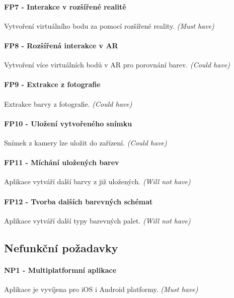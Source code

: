 \paragraph{FP7 - Interakce v rozšířené realitě} Vytvoření virtuálního bodu za pomocí rozšířené reality. \emph{(Must have)} 
\paragraph{FP8 - Rozšířená interakce v AR} Vytvoření více virtuálních bodů v AR pro porovnání barev. \emph{(Could have)} 
\paragraph{FP9 - Extrakce z fotografie} Extrakce barvy z fotografie. \emph{(Could have)} 
\paragraph{FP10 - Uložení vytvořeného snímku} Snímek z kamery lze uložit do zařízení. \emph{(Could have)} 
\paragraph{FP11 - Míchání uložených barev} Aplikace vytváří další barvy z již uložených. \emph{(Will not have)} 
\paragraph{FP12 - Tvorba dalších barevných schémat} Aplikace vytváří další typy barevných palet. \emph{(Will not have)} 

\subsection{Nefunkční požadavky}
\paragraph{NP1 - Multiplatformní aplikace} Aplikace je vyvíjena pro iOS i Android platformy. \emph{(Must have)} 
